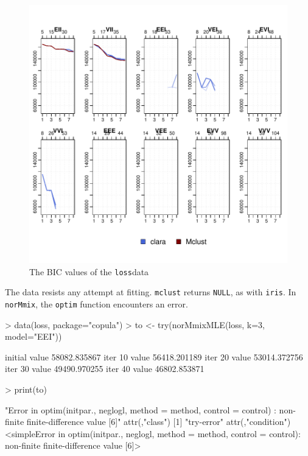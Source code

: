 \begin{figure}[h!]
    \begin{Rgraph}[0.9]
\includegraphics{chapter3-figloss}
    \caption{The BIC values of the {\tt loss}data}
    \label{fig:loss}
    \end{Rgraph}
\end{figure}

The data resists any attempt at fitting. {\tt mclust} returns {\tt NULL}, as 
with {\tt iris}. In {\tt norMmix}, the {\tt optim} function encounters an error.

\begin{Schunk}
\begin{Sinput}
>     data(loss, package="copula")
>     to <- try(norMmixMLE(loss, k=3, model="EEI"))
\end{Sinput}
\begin{Soutput}
initial  value 58082.835867 
iter  10 value 56418.201189
iter  20 value 53014.372756
iter  30 value 49490.970255
iter  40 value 46802.853871
\end{Soutput}
\begin{Sinput}
>     print(to)
\end{Sinput}
\begin{Soutput}
[1] "Error in optim(initpar., neglogl, method = method, control = control) : \n  non-finite finite-difference value [6]\n"
attr(,"class")
[1] "try-error"
attr(,"condition")
<simpleError in optim(initpar., neglogl, method = method, control = control): non-finite finite-difference value [6]>
\end{Soutput}
\end{Schunk}

